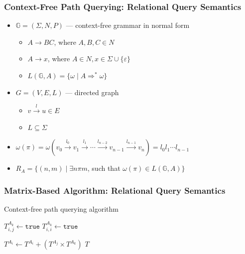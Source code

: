 \documentclass[xcolor=table,aspectratio=169]{beamer}
\begin{document}
  \begin{frame}[fragile]
    \frametitle{Context-Free Path Querying: Relational Query Semantics}
    \begin{itemize}
      \item $\mathbb{G} = (\Sigma, N, P)$ --- context-free grammar in normal form
      \begin{itemize}
        \item $A \rightarrow B C$, where $A, B, C \in N$
        \item $A \rightarrow x$, where $A \in N, x \in \Sigma \cup \{\varepsilon\}$
        \item $L(\mathbb{G},A) = \{ \omega \mid A \Rightarrow^* \omega \}$
      \end{itemize}
      \pause
      \item $G = (V,E,L)$ --- directed graph
        \begin{itemize}
          \item $v \xrightarrow{l} u \in E$
          \item $L \subseteq \Sigma$
        \end{itemize}
        \pause
      \item $\omega(\pi) = \omega(v_0 \xrightarrow{l_0} v_1 \xrightarrow{l_1} \cdots \xrightarrow{l_{n-2}} v_{n-1} \xrightarrow{l_{n-1}} v_n) = l_0 l_1 \cdots l_{n-1}$
      \pause
      \item $R_A = \{ (n, m) \mid \exists n \pi m$, such that $\omega(\pi) \in L(\mathbb{G},A)\}$
    \end{itemize}
  \end{frame}

  \begin{frame}[fragile] \frametitle{Matrix-Based Algorithm: Relational Query Semantics}
    	\begin{algorithm}[H]
    		\begin{algorithmic}[1]
    			\caption{Context-free path querying algorithm}
    			\label{lst:algo1}
    			{$T^{A_k}_{i,j} \gets \texttt{true}$}
    			\EndFor
    			{$T^{A_k}_{i,i} \gets \texttt{true}$}
    			\EndFor
    			\EndFor
    			
    			{ $T^{A_i} \gets T^{A_i} + (T^{A_j} \times T^{A_k})$ } 
    			\EndFor
    			\EndWhile
    			\State \Return $T$
    			\EndFunction
    		\end{algorithmic}
    	\end{algorithm}
  \end{frame}
\end{document}
